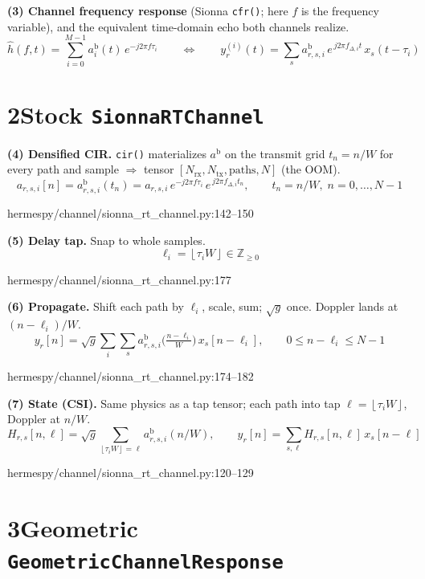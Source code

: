 \documentclass[11pt]{article}
\newcommand{\ab}{a^{\mathrm{b}}}
\newcommand{\src}[1]{{\footnotesize\ttfamily #1}}
\newcommand{\eqsrc}[1]{\par\vspace{-4pt}\hfill\src{#1}\par\vspace{2pt}}
\newcommand{\flr}[1]{\left\lfloor #1 \right\rfloor}
\begin{document}
\textbf{(3) Channel frequency response} (Sionna \texttt{cfr()}; here $f$ is the frequency variable),
and the equivalent time-domain echo both channels realize.
\begin{equation}
\hat h(f,t) = \sum_{i=0}^{M-1}\ab_i(t)\,e^{-j2\pi f\tau_i}
\qquad\Longleftrightarrow\qquad
y_r^{(i)}(t) = \sum_s \ab_{r,s,i}\,e^{\,j2\pi f_{\Delta,i}t}\,x_s(t-\tau_i)
\end{equation}

\section*{2\quad Stock \texttt{SionnaRTChannel}}

\textbf{(4) Densified CIR.} \texttt{cir()} materializes $\ab$ on the transmit grid $t_n=n/W$ for every
path and sample $\Rightarrow$ tensor $[N_{\text{rx}},N_{\text{tx}},\text{paths},N]$ (the OOM).
\begin{equation}
a_{r,s,i}[n] = \ab_{r,s,i}(t_n) = a_{r,s,i}\,e^{-j2\pi f\tau_i}\,e^{\,j2\pi f_{\Delta,i}t_n},
\qquad t_n = n/W,\; n=0,\dots,N-1
\end{equation}
\eqsrc{hermespy/channel/sionna\_rt\_channel.py:142--150}

\textbf{(5) Delay tap.} Snap to whole samples.
\begin{equation}
\ell_i = \flr{\tau_i W}\in\mathbb{Z}_{\ge 0}
\end{equation}
\eqsrc{hermespy/channel/sionna\_rt\_channel.py:177}

\textbf{(6) Propagate.} Shift each path by $\ell_i$, scale, sum; $\sqrt{g}$ once. Doppler lands at
$(n-\ell_i)/W$.
\begin{equation}
y_r[n] = \sqrt{g}\sum_i\sum_s \ab_{r,s,i}\!\Big(\tfrac{n-\ell_i}{W}\Big)\,x_s[n-\ell_i],
\qquad 0\le n-\ell_i\le N-1
\end{equation}
\eqsrc{hermespy/channel/sionna\_rt\_channel.py:174--182}

\textbf{(7) State (CSI).} Same physics as a tap tensor; each path into tap $\ell=\flr{\tau_i W}$,
Doppler at $n/W$.
\begin{equation}
H_{r,s}[n,\ell] = \sqrt{g}\!\!\sum_{\flr{\tau_i W}=\ell}\!\! \ab_{r,s,i}(n/W),
\qquad y_r[n]=\sum_{s,\ell}H_{r,s}[n,\ell]\,x_s[n-\ell]
\end{equation}
\eqsrc{hermespy/channel/sionna\_rt\_channel.py:120--129}

\section*{3\quad Geometric \texttt{GeometricChannelResponse}}
\end{document}
